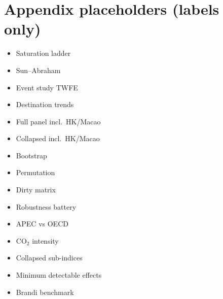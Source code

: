 \documentclass[11pt]{article}
\begin{document}
\newpage
\appendix
\section*{Appendix placeholders (labels only)}
\footnotesize
\begin{itemize}\itemsep1pt
\item Saturation ladder \label{tab:ladder_wb}\label{tab:ladder_trend}
\item Sun--Abraham \label{tab:sunab}
\item Event study TWFE \label{tab:eventstudy_twfe}
\item Destination trends \label{tab:trends}
\item Full panel incl.\ HK/Macao \label{tab:fullpanel_inclHKMO}
\item Collapsed incl.\ HK/Macao \label{tab:collapsed_inclHKMO}
\item Bootstrap \label{tab:wcb}
\item Permutation \label{tab:perm}
\item Dirty matrix \label{tab:matrice}
\item Robustness battery \label{tab:robust-full}
\item APEC vs OECD \label{tab:apec}
\item CO$_2$ intensity \label{tab:co2}
\item Collapsed sub-indices \label{tab:subindex}
\item Minimum detectable effects \label{tab:mde}
\item Brandi benchmark \label{tab:brandi}
\end{itemize}
\normalsize
\end{document}
